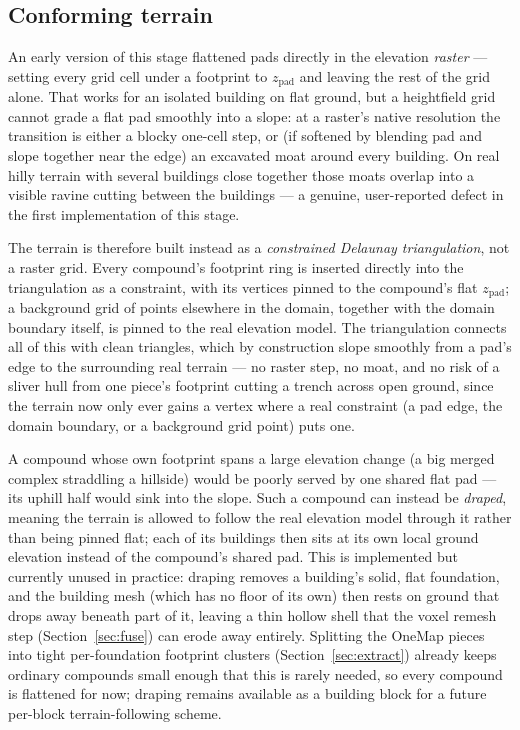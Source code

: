 \documentclass[11pt]{article}
\begin{document}
\subsection{Conforming terrain}
\label{sec:conforming-terrain}

An early version of this stage flattened pads directly in the elevation \emph{raster} --- setting
every grid cell under a footprint to $z_{\text{pad}}$ and leaving the rest of the grid alone. That
works for an isolated building on flat ground, but a heightfield grid cannot grade a flat pad
smoothly into a slope: at a raster's native resolution the transition is either a blocky one-cell
step, or (if softened by blending pad and slope together near the edge) an excavated moat around
every building. On real hilly terrain with several buildings close together those moats overlap
into a visible ravine cutting between the buildings --- a genuine, user-reported defect in the
first implementation of this stage.

The terrain is therefore built instead as a \emph{constrained Delaunay triangulation}, not a
raster grid. Every compound's footprint ring is inserted directly into the triangulation as a
constraint, with its vertices pinned to the compound's flat $z_{\text{pad}}$; a background grid of
points elsewhere in the domain, together with the domain boundary itself, is pinned to the real
elevation model. The triangulation connects all of this with clean triangles, which by
construction slope smoothly from a pad's edge to the surrounding real terrain --- no raster step,
no moat, and no risk of a sliver hull from one piece's footprint cutting a trench across open
ground, since the terrain now only ever gains a vertex where a real constraint (a pad edge, the
domain boundary, or a background grid point) puts one.

A compound whose own footprint spans a large elevation change (a big merged complex straddling a
hillside) would be poorly served by one shared flat pad --- its uphill half would sink into the
slope. Such a compound can instead be \emph{draped}, meaning the terrain is allowed to follow the
real elevation model through it rather than being pinned flat; each of its buildings then sits at
its own local ground elevation instead of the compound's shared pad. This is implemented but
currently unused in practice: draping removes a building's solid, flat foundation, and the
building mesh (which has no floor of its own) then rests on ground that drops away beneath part of
it, leaving a thin hollow shell that the voxel remesh step (Section~\ref{sec:fuse}) can erode away
entirely. Splitting the OneMap pieces into tight per-foundation footprint clusters
(Section~\ref{sec:extract}) already keeps ordinary compounds small enough that this is rarely
needed, so every compound is flattened for now; draping remains available as a building block for
a future per-block terrain-following scheme.
\end{document}
